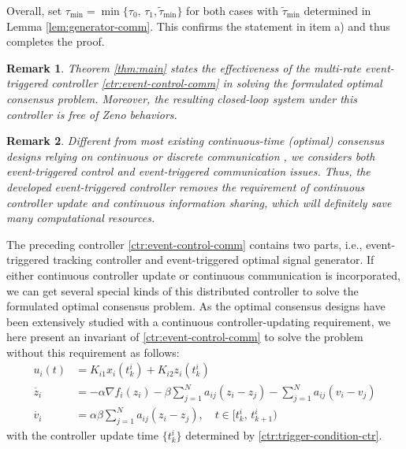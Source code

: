 \documentclass[sort&compress]{IEEEtran}
\newtheorem{rem}{Remark}
\begin{document}
Overall,  set $\tau_{\min}=\min \{\tau_0,\,\tau_1,\tilde \tau_{\min}\}$ for both cases with $\tilde \tau_{\min}$ determined in Lemma \ref{lem:generator-comm}. This confirms the statement in item a) and thus completes the proof. {\hfill\IEEEQEDhere }

\begin{rem}\label{rem:zeno}
	Theorem \ref{thm:main} states the effectiveness of the multi-rate event-triggered controller \eqref{ctr:event-control-comm} in solving the formulated optimal consensus problem. Moreover, the resulting closed-loop system  under this controller is free of Zeno behaviors.  
\end{rem}
\begin{rem}\label{rem:event}
	Different from most existing continuous-time (optimal) consensus designs relying on continuous or discrete communication \cite{nowzari2019event,xie2017global, tang2019optimal, deng2016distributed,  li2020distributed, wang2018event, li2019distributed, an2021distributed} , we considers both event-triggered control and event-triggered communication issues. Thus, the developed event-triggered controller removes the requirement of continuous controller update and continuous information sharing, which will definitely save many computational resources. 
\end{rem}

The preceding controller \eqref{ctr:event-control-comm} contains two parts, i.e., event-triggered   tracking controller and event-triggered optimal signal generator. If either continuous controller update or continuous communication is incorporated, we can get several special kinds of this distributed controller to solve the formulated optimal consensus problem. As the optimal consensus designs have been extensively studied with a continuous controller-updating requirement, we here present an invariant of \eqref{ctr:event-control-comm} to solve the problem without this requirement as follows:  
\begin{align}\label{ctr:event-control}
	u_i(t)&=K_{i1} x_i(t^i_k)+K_{i2} z_i(t^i_k)\nonumber\\
	\dot{z_i}&= -\alpha \nabla f_i(z_i)-\beta \sum_{j=1}^{N}a_{ij}(z_i-z_j)-\sum_{j=1}^{N} a_{ij}(v_i- v_j) \nonumber \\
	\dot{v_i} &=\alpha \beta \sum_{j=1}^{N}a_{ij}(z_i- z_j),\quad t\in [t^i_k,\,t^i_{k+1})  
\end{align}
with the controller update time $\{t^i_{k}\}$  determined by  \eqref{ctr:trigger-condition-ctr}.  
\end{document}
